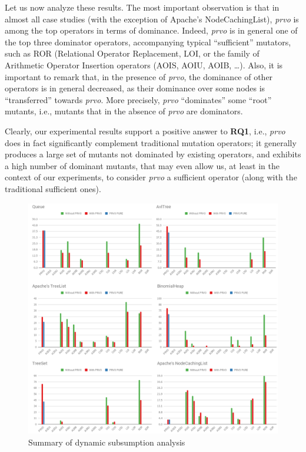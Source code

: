 Let us now analyze these results. The most important observation is that in almost all case studies (with the exception of Apache's NodeCachingList), \emph{prvo} is among the top operators in terms of dominance. Indeed, \emph{prvo} is in general one of the top three dominator operators, accompanying typical ``sufficient'' mutators, such as ROR (Relational Operator Replacement, LOI, or the family of Arithmetic Operator Insertion operators (AOIS, AOIU, AOIB, \dots). Also, it is important to remark that, in the presence of \emph{prvo}, the dominance of other operators is in general decreased, as their dominance over some nodes is ``transferred'' towards \emph{prvo}. More precisely, \emph{prvo} ``dominates'' some ``root'' mutants, i.e., mutants that in the absence of \emph{prvo} are dominators.    

Clearly, our experimental results support a positive answer to \textbf{RQ1}, i.e., \emph{prvo} does in fact significantly complement traditional mutation operators; it generally produces a large set of mutants not dominated by existing operators, and exhibits a high number of dominant mutants, that may even allow us, at least in the context of our experiments, to consider \emph{prvo} a sufficient operator (along with the traditional sufficient ones). 

\begin{figure}[t]
	\begin{center}
		\includegraphics[width=12cm]{figures/Tables.png}
	\end{center}
	\caption{Summary of dynamic subsumption analysis}
	\label{subsumption-results}
\end{figure}

